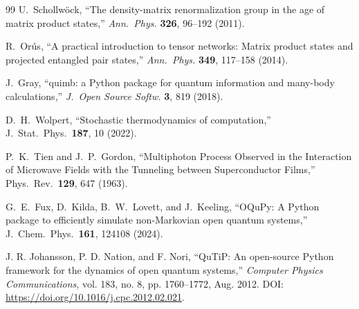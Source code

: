 \documentclass[11pt,a4paper]{article}
\theoremstyle{plain}
\theoremstyle{definition}
\theoremstyle{remark}
\begin{document}
\begin{thebibliography}{99}
 U.~Schollw\"ock, ``The density-matrix
renormalization group in the age of matrix product states,''
\emph{Ann.\ Phys.} \textbf{326}, 96--192 (2011).

 R.~Or\'us, ``A practical introduction to tensor
networks: Matrix product states and projected entangled pair states,''
\emph{Ann.\ Phys.} \textbf{349}, 117--158 (2014).

 J.~Gray, ``quimb: a Python package for quantum
information and many-body calculations,'' \emph{J.\ Open Source Softw.}
\textbf{3}, 819 (2018).

 D.~H.~Wolpert, “Stochastic thermodynamics of computation,” J.\ Stat.\ Phys.\ \textbf{187}, 10 (2022).

 P.~K.~Tien and J.~P.~Gordon, ``Multiphoton Process Observed in the Interaction of Microwave Fields with the Tunneling between Superconductor Films,'' Phys.\ Rev.\ \textbf{129}, 647 (1963).

 G.~E.~Fux, D.~Kilda, B.~W.~Lovett, and J.~Keeling, “OQuPy: A Python package to efficiently simulate non‑Markovian open quantum systems,” J.\ Chem.\ Phys.\ \textbf{161}, 124108 (2024).

J. R. Johansson, P. D. Nation, and F. Nori,
``QuTiP: An open-source Python framework for the dynamics of open quantum systems,''
\textit{Computer Physics Communications},
vol. 183, no. 8, pp. 1760--1772, Aug. 2012.
DOI: \url{https://doi.org/10.1016/j.cpc.2012.02.021}.
\end{thebibliography}
\end{document}
